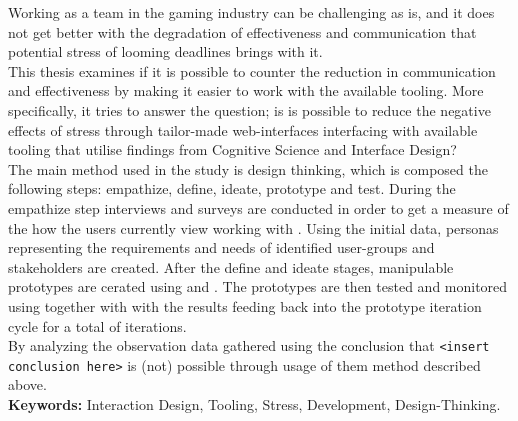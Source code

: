 
Working as a team in the gaming industry can be challenging as is, and it
does not get better with the degradation of effectiveness and communication
that potential stress of looming deadlines brings with it. \\

This thesis examines if it is possible to counter the reduction
in communication and effectiveness by making it easier to work with the
available tooling. More specifically, it tries to answer the question; is is
possible to reduce the negative effects of stress through tailor-made
web-interfaces interfacing with available tooling that utilise findings from
Cognitive Science and Interface Design?  \\

The main method used in the study is design thinking, which is composed the
following steps: empathize, define, ideate, prototype and test. During the
empathize step interviews and surveys are conducted in order to get a measure
of the how the users currently view working with {\shotgun}.
Using the initial data, personas representing the requirements and needs of
identified user-groups and stakeholders are created.
After the define and ideate stages, manipulable prototypes are cerated using
{\python} and {\flask}. The prototypes are then tested and monitored using
{\recordingSystem} together with {\reviewProtocol} with the results
feeding back into the prototype iteration cycle for a total of {\numIterations}
iterations. \\

By analyzing the observation data gathered using {\recordingSystem} the
conclusion that {\texttt{<insert conclusion here>}} is (not) possible through
usage of them method described above. \\

\textbf{Keywords:}
  Interaction Design,
  Tooling,
  Stress,
  Development,
  Design-Thinking.
